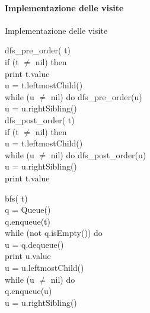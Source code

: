 \paragraph{Implementazione delle visite}
\begin{code}{Implementazione delle visite}
    \begin{minipage}[t]{0.48\textwidth}
        \rmbreak\ind dfs\_pre\_order( t)\\
            \indf if (t $\neq$ nil) then\\
                print t.value\\
                 u = t.leftmostChild()\\
                \indff while (u $\neq$ nil) do
                    dfs\_pre\_order(u)\\
                    u = u.rightSibling()\\

        \noindent{}
        \rmbreak\ind dfs\_post\_order( t)\\
            \indf if (t $\neq$ nil) then\\
                 u = t.leftmostChild()\\
                \indff while (u $\neq$ nil) do
                    dfs\_post\_order(u)\\
                    u = u.rightSibling()\\
                \indff print t.value\\
    \end{minipage}
    \hfill
    \begin{minipage}[t]{0.48\textwidth}
        \rmbreak\ind bfs( t)\\
             q = Queue()\\
            q.enqueue(t)\\
            \indf while (not q.isEmpty()) do\\
                 u = q.dequeue()\\
                print u.value\\
                u = u.leftmostChild()\\
                \indff while (u $\neq$ nil) do\\
                    q.enqueue(u)\\
                    u = u.rightSibling()\\
    \end{minipage}
\end{code}